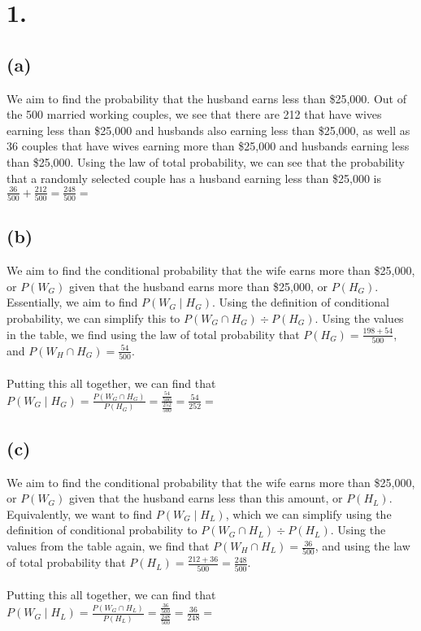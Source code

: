 \documentclass{article}
\begin{document}
\thispagestyle{firstpageheader}

\section*{1.}
{\Large 

\subsection*{(a)}

We aim to find the probability that the husband earns less than \$25,000. Out of the 500 married working couples, we see that there are 212 that have wives earning less than \$25,000 and husbands also earning less than \$25,000, as well as 36 couples that have wives earning more than \$25,000 and husbands earning less than \$25,000. Using the law of total probability, we can see that the probability that a randomly selected couple has a husband earning less than \$25,000 is $\frac{36}{500} + \frac{212}{500} = \frac{248}{500} = $ 

\subsection*{(b)}

We aim to find the conditional probability that the wife earns more than \$25,000, or $P(W_G)$ given that the husband
earns more than \$25,000, or $P(H_G)$. Essentially, we aim to find $P(W_G \mid H_G)$. Using the definition of conditional probability, we can simplify this to $P(W_G \cap H_G) \div P(H_G)$. Using the values in the table, we find using the law of total probability that $P(H_G) = \frac{198 + 54}{500}$, and $P(W_H \cap H_G) = \frac{54}{500}$. \\ \\
Putting this all together, we can find that $P(W_G \mid H_G) = \frac{P(W_G \cap H_G)}{P(H_G)} = \frac{\frac{54}{500}}{\frac{252}{500}} = \frac{54}{252} = $ 

\subsection*{(c)}

We aim to find the conditional probability that the wife earns more than \$25,000, or $P(W_G)$ given that the husband earns less than this amount, or $P(H_L)$. Equivalently, we want to find $P(W_G \mid H_L)$, which we can simplify using the definition of conditional probability to $P(W_G \cap H_L) \div P(H_L)$. Using the values from the table again, we find that $P(W_H \cap H_L) = \frac{36}{500}$, and using the law of total probability that $P(H_L) = \frac{212 + 36}{500} = \frac{248}{500}$. \\ \\ 
Putting this all together, we can find that $ P(W_G \mid H_L) = \frac{P(W_G \cap H_L)}{P(H_L)} = \frac{\frac{36}{500}}{\frac{248}{500}} = \frac{36}{248} = $ 


}
\end{document}
